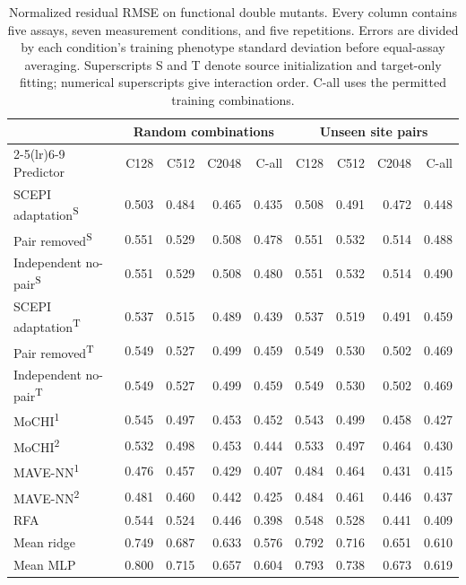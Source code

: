\documentclass{llncs}
\begin{document}
\begin{table}[H]
\centering
\setlength{\tabcolsep}{3.5pt}
\caption{Normalized residual RMSE on functional double mutants. Every column contains five assays, seven measurement conditions, and five repetitions. Errors are divided by each condition's training phenotype standard deviation before equal-assay averaging. Superscripts S and T denote source initialization and target-only fitting; numerical superscripts give interaction order. C-all uses the permitted training combinations.}
\label{tab:functionalresidual}
\begin{tabular}{lrrrrrrrr}
\toprule
 & \multicolumn{4}{c}{Random combinations} & \multicolumn{4}{c}{Unseen site pairs} \\
\cmidrule(lr){2-5}\cmidrule(lr){6-9}
Predictor & C128 & C512 & C2048 & C-all & C128 & C512 & C2048 & C-all \\
\midrule
SCEPI adaptation\textsuperscript{S} & 0.503 & 0.484 & 0.465 & 0.435 & 0.508 & 0.491 & 0.472 & 0.448 \\
Pair removed\textsuperscript{S} & 0.551 & 0.529 & 0.508 & 0.478 & 0.551 & 0.532 & 0.514 & 0.488 \\
Independent no-pair\textsuperscript{S} & 0.551 & 0.529 & 0.508 & 0.480 & 0.551 & 0.532 & 0.514 & 0.490 \\
SCEPI adaptation\textsuperscript{T} & 0.537 & 0.515 & 0.489 & 0.439 & 0.537 & 0.519 & 0.491 & 0.459 \\
Pair removed\textsuperscript{T} & 0.549 & 0.527 & 0.499 & 0.459 & 0.549 & 0.530 & 0.502 & 0.469 \\
Independent no-pair\textsuperscript{T} & 0.549 & 0.527 & 0.499 & 0.459 & 0.549 & 0.530 & 0.502 & 0.469 \\
MoCHI\textsuperscript{1} & 0.545 & 0.497 & 0.453 & 0.452 & 0.543 & 0.499 & 0.458 & 0.427 \\
MoCHI\textsuperscript{2} & 0.532 & 0.498 & 0.453 & 0.444 & 0.533 & 0.497 & 0.464 & 0.430 \\
MAVE-NN\textsuperscript{1} & 0.476 & 0.457 & 0.429 & 0.407 & 0.484 & 0.464 & 0.431 & 0.415 \\
MAVE-NN\textsuperscript{2} & 0.481 & 0.460 & 0.442 & 0.425 & 0.484 & 0.461 & 0.446 & 0.437 \\
RFA & 0.544 & 0.524 & 0.446 & 0.398 & 0.548 & 0.528 & 0.441 & 0.409 \\
Mean ridge & 0.749 & 0.687 & 0.633 & 0.576 & 0.792 & 0.716 & 0.651 & 0.610 \\
Mean MLP & 0.800 & 0.715 & 0.657 & 0.604 & 0.793 & 0.738 & 0.673 & 0.619 \\
\bottomrule
\end{tabular}
\end{table}
\end{document}

